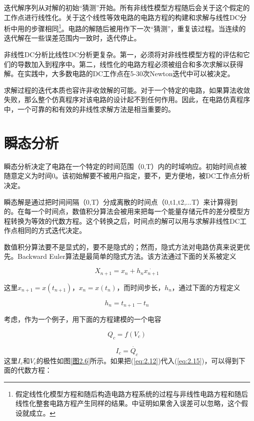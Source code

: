 迭代解序列从对解的初始“猜测”开始。所有非线性模型方程随后会关于这个假定的工作点进行线性化。关于这个线性等效电路的电路方程的构建和求解与线性DC分析中用的步骤相同\footnote{假定线性化模型方程和随后构造电路方程系统的过程与非线性电路方程和随后线性化整套电路方程产生同样的结果。\cite{ref-37}中证明如果舍入误差可以忽略，这个假设就成立。}。电路的解随后被用作下一次“猜测”，重复该过程。当连续的迭代解在一些误差范围内一致时，迭代停止。

非线性DC分析比线性DC分析更复杂。第一，必须将对非线性模型方程的评估和它们的导数加入到程序中。第二，线性化的电路方程必须被组合和多次求解以获得解。在实践中，大多数电路的DC工作点在5-30次Newton迭代中可以被决定。

求解过程的迭代本质也容许非收敛解的可能。对于一个特定的电路，如果算法收敛失败，那么整个仿真程序对该电路的设计起不到任何作用。因此，在电路仿真程序中，一个可靠的和有效的非线性求解方法是相当重要的。

\section{瞬态分析}
瞬态分析决定了电路在一个特定的时间范围（0,T）内的时域响应。初始时间点被随意定义为时间0。该初始解要不被用户指定，要不，更方便地，被DC工作点分析决定。

瞬态解是通过把时间间隔（0,T）分成离散的时间点（0,t1,t2,...T）来计算得到的。在每一个时间点，数值积分算法会被用来把每一个能量存储元件的差分模型方程转换为等效的代数方程。这个转换之后，时间点的解可以用与求解非线性DC工作点相同的方式迭代决定。

数值积分算法要不是显式的，要不是隐式的；然而，隐式方法对电路仿真来说更优先。Backward Euler算法是最简单的隐式方法。该方法通过下面的关系被定义

\begin{equation}
    X_{n+1} = x_n + h_n\dot{x_{n+1}}
    \label{eq:2.12}
\end{equation}

这里$x_{n+1}=x(t_{n+1})$，$x_n=x(t_n)$，而时间步长，$h_n$，通过下面的方程定义

\begin{equation}
    h_n = t_{n+1}-t_n
    \label{eq:2.13}
\end{equation}

考虑，作为一个例子，用下面的方程建模的一个电容

\begin{equation}
    Q_c=f(V_c)
    \label{eq:2.14}
\end{equation}

\begin{equation}
    I_c = \dot{Q_c}
    \label{eq:2.15}
\end{equation}
这里$I_c$和$V_c$的极性如图\ref{图2.6}所示。如果把(\ref{eq:2.12})代入(\ref{eq:2.15})，可以得到下面的代数方程：

